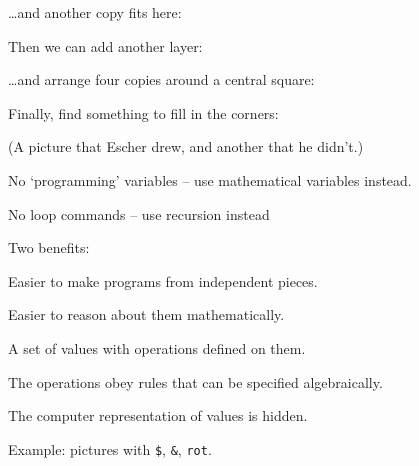 


\dots and another copy fits here:




Then we can add another layer:




\dots and arrange four copies around a central square:




Finally, find something to fill in the corners:



(A picture that Escher drew, and another that he didn't.)


\item No `programming' variables -- use mathematical variables instead.
\item No loop commands -- use recursion instead

Two benefits:

\item Easier to make programs from independent pieces.
\item Easier to reason about them mathematically.


A set of values with operations defined on them.

\item The operations obey rules that can be specified algebraically.
\item The computer representation of values is hidden.


Example: pictures with \verb/$/, \verb/&/, \verb/rot/.

